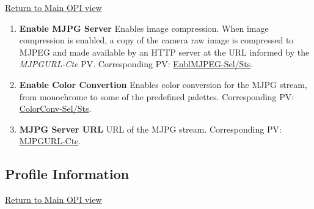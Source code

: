\documentclass[openany]{article}
\begin{document}
        \hyperref[fig:opi-main]{Return to Main OPI view}

        \begin{enumerate}
            \item \textbf{Enable MJPG Server} Enables image compression. When image compression is enabled, a copy of the camera raw image is compressed to MJPEG and made available by an HTTP server at the URL informed by the \emph{MJPGURL-Cte} PV. Corresponding PV: \hyperlink{pv:enbl-mjpeg}{EnblMJPEG-Sel/Sts}.
            \item \textbf{Enable Color Convertion} Enables color conversion for the MJPG stream, from monochrome to some of the predefined palettes. Corresponding PV: \hyperlink{pv:color-conv}{ColorConv-Sel/Sts}.
            \item \textbf{MJPG Server URL} URL of the MJPG stream. Corresponding PV: \hyperlink{pv:mjpg-url}{MJPGURL-Cte}.
        \end{enumerate}

    \subsection{Profile Information}\label{sec:profile-info}

        \hyperref[fig:opi-main]{Return to Main OPI view}
\end{document}
